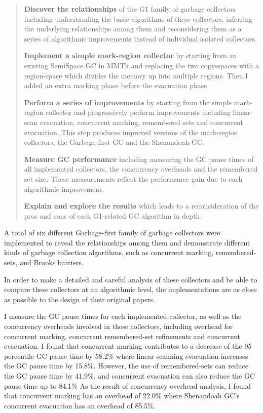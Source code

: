 \begin{quote}
  \textbf{Discover the relationships}
    of the G1 family of garbage collectors including understanding the basic algorithms
    of these collectors, inferring the underlying relationships among them and reconsidering them as
    a series of algorithmic improvements instead of individual isolated collectors.

  \textbf{Implement a simple mark-region collector}
    by starting from an existing SemiSpace GC in MMTk and replacing the two copy-spaces
    with a region-space which divides the memory up into multiple regions.
    Then I added an extra marking phase before the evacuation phase.

  \textbf{Perform a series of improvements}
    by starting from the simple mark-region collector and progressively perform
    improvements including linear-scan evacuation, concurrent marking, remembered sets
    and concurrent evacuation. This step produces improved versions of the
    mark-region collectors, the Garbage-first GC and the Shenandoah GC.

  \textbf{Measure GC performance}
    including measuring the GC pause times of all implemented collectors, the 
    concurrency overheads and the remembered set size. These measurements reflect the
    performance gain due to each algorithmic improvement.

  \textbf{Explain and explore the results} which leads to a reconsideration
    of the pros and cons of each G1-related GC algorithm in depth.
\end{quote}

A total of six different Garbage-first family of garbage collectors were implemented to reveal
the relationships among them and demonstrate different kinds of garbage collection
algorithms, such as concurrent marking, remembered-sets, and Brooks barriers.

In order to make a detailed and careful analysis of these collectors and
be able to compare these collectors at an algorithmic level, the implementations
are as close as possible to the design of their original papers.

I measure the GC pause times for each implemented collector, as well as the concurrency
overheads involved in these collectors, including
overhead for concurrent marking, concurrent remembered-set refinements and concurrent evacuation.
I found that concurrent marking contributes to a decrease of the 95 percentile GC pause time by 58.2\%
where linear scanning evacuation increases the GC pause time by 15.8\%.
However, the use of remembered-sets can reduce the GC pause time by 41.9\%,
and concurrent evacuation can also reduce the GC pause time up to 84.1\%
As the result of concurrency overhead analysis, I found that concurrent marking has
an overhead of 22.0\% where Shenandoah GC's concurrent evacuation
has an overhead of 85.5\%.

